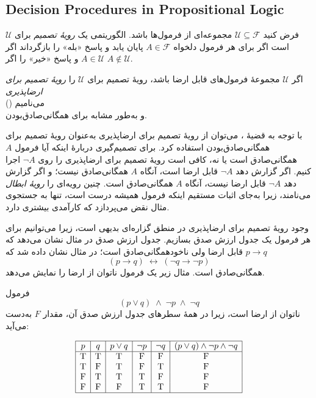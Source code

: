 \subsection*{ Decision Procedures in Propositional Logic}
    \begin{definition}[تعریف \lr{2.40}]
      فرض کنید $\mathscr{U} \subseteq \mathscr{F}$ مجموعه‌ای از فرمول‌ها باشد. الگوریتمی یک \emph{رویهٔ تصمیم} برای $\mathscr{U}$ است اگر برای هر فرمول دلخواه $A \in \mathscr{F}$ پایان یابد و پاسخ «بله» را بازگرداند اگر $A \in \mathscr{U}$ و پاسخ «خیر» را اگر $A \notin \mathscr{U}$.
      
      اگر $\mathscr{U}$ مجموعهٔ فرمول‌های قابل ارضا باشد، رویهٔ تصمیم برای $\mathscr{U}$ را \emph{رویهٔ تصمیم برای ارضاپذیری}\\ () می‌نامیم\\ و به‌طور مشابه برای همگانی‌صادق‌بودن.
      
      با توجه به قضیهٔ ، می‌توان از رویهٔ تصمیم برای ارضاپذیری به‌عنوان رویهٔ تصمیم برای همگانی‌صادق‌بودن استفاده کرد. برای تصمیم‌گیری دربارهٔ اینکه آیا فرمول $A$ همگانی‌صادق است یا نه، کافی است رویهٔ تصمیم برای ارضاپذیری را روی $\neg A$ اجرا کنیم. اگر گزارش دهد $\neg A$ قابل ارضا است، آنگاه $A$ همگانی‌صادق نیست؛ و اگر گزارش دهد $\neg A$ قابل ارضا نیست، آنگاه $A$ همگانی‌صادق است. چنین رویه‌ای را \emph{رویهٔ ابطال}  می‌نامند، زیرا به‌جای اثبات مستقیم اینکه فرمول همیشه درست است، تنها به جستجوی مثال نقض می‌پردازد که کارآمدی بیشتری دارد.
    \end{definition}
    
    وجود رویهٔ تصمیم برای ارضاپذیری در منطق گزاره‌ای بدیهی است، زیرا می‌توانیم برای هر فرمول یک جدول ارزش صدق بسازیم. جدول ارزش صدق در مثال  نشان می‌دهد که $p \to q$ قابل ارضا ولی ناخودهمگانی‌صادق است؛ در مثال  نشان داده شد که
    \[
    (p \to q) \;\leftrightarrow\; (\neg q \to \neg p)
    \]
    همگانی‌صادق است. مثال زیر یک فرمول ناتوان از ارضا را نمایش می‌دهد.
    
    \begin{example}[مثال \lr{2.41}]
      فرمول
      \[
      (p \lor q)\;\land\;\neg p\;\land\;\neg q
      \]
      ناتوان از ارضا است، زیرا در همهٔ سطرهای جدول ارزش صدق آن، مقدار \(F\) به‌دست می‌آید:
      
      \[
      \begin{array}{|c|c|c|c|c|c|}
      \hline
      p & q & p \lor q & \neg p & \neg q & (p \lor q)\land\neg p\land\neg q\\\hline
      $T$ & $T$ & $T$ & $F$ & $F$ & $F$\\
      $T$ & $F$ & $T$ & $F$ & $T$ & $F$\\
      $F$ & $T$ & $T$ & $T$ & $F$ & $F$\\
      $F$ & $F$ & $F$ & $T$ & $T$ & $F$\\\hline
      \end{array}
      \]
    \end{example}
    
